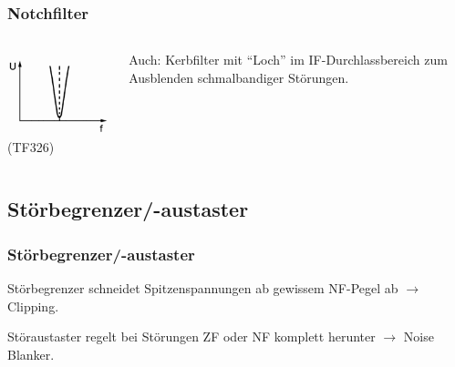 \begin{frame}
    \frametitle{Notchfilter}

    \begin{columns}
      \begin{center}
      \includegraphics[width=\textwidth,height=.8\textheight,keepaspectratio]{a18/TF326a.png}\\
      {\tiny (TF326)}
      \end{center}

      Auch: Kerbfilter mit ``Loch'' im IF-Durchlassbereich zum Ausblenden
      schmalbandiger Störungen.

    \end{columns}


\end{frame}

\subsection{Störbegrenzer/-austaster}

\begin{frame}
    \frametitle{Störbegrenzer/-austaster}

    Störbegrenzer schneidet Spitzenspannungen ab gewissem NF-Pegel ab
    $\rightarrow$ Clipping.

    \bigskip

    Störaustaster regelt bei Störungen ZF oder NF komplett herunter
    $\rightarrow$ Noise Blanker.


\end{frame}

